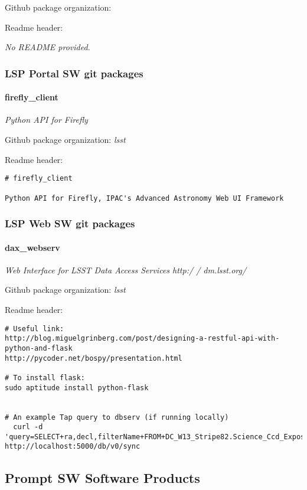 Github package organization: \textit{}

Readme header:

\textit{No README provided.}

\subsubsection{LSP Portal SW git packages}
\paragraph{firefly\_client}
\textit{Python API for Firefly}

Github package organization: \textit{lsst}

Readme header:

\begin{verbatim}
# firefly_client

Python API for Firefly, IPAC's Advanced Astronomy Web UI Framework

\end{verbatim}

\subsubsection{LSP Web SW git packages}
\paragraph{dax\_webserv}
\textit{Web Interface for LSST Data Access Services http:/ / dm.lsst.org/ }

Github package organization: \textit{lsst}

Readme header:

\begin{verbatim}
# Useful link:
http://blog.miguelgrinberg.com/post/designing-a-restful-api-with-python-and-flask
http://pycoder.net/bospy/presentation.html

# To install flask:
sudo aptitude install python-flask


# An example Tap query to dbserv (if running locally)
  curl -d 'query=SELECT+ra,decl,filterName+FROM+DC_W13_Stripe82.Science_Ccd_Exposure+WHERE+scienceCcdExposureId=125230127' http://localhost:5000/db/v0/sync\end{verbatim}

\subsection{Prompt SW Software Products}
